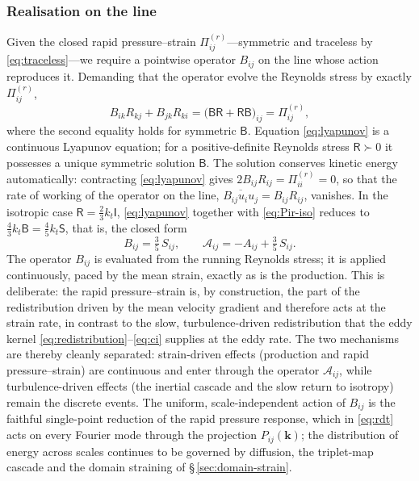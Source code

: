 \documentclass[lineno]{JFM-FLM_Au}
\begin{document}
\subsubsection{Realisation on the line}

Given the closed rapid pressure--strain $\Pi_{ij}^{(r)}$---symmetric and
traceless by \eqref{eq:traceless}---we require a pointwise operator
$B_{ij}$ on the line whose action reproduces it. Demanding that the
operator evolve the Reynolds stress by exactly $\Pi_{ij}^{(r)}$,
\begin{equation}
  B_{ik}R_{kj}+B_{jk}R_{ki}
  = \big(\mathsf{B}\mathsf{R}+\mathsf{R}\mathsf{B}\big)_{ij}
  = \Pi_{ij}^{(r)},
  \label{eq:lyapunov}
\end{equation}
where the second equality holds for symmetric $\mathsf{B}$. Equation
\eqref{eq:lyapunov} is a continuous Lyapunov equation; for a
positive-definite Reynolds stress $\mathsf{R}\succ0$ it possesses a unique
symmetric solution $\mathsf{B}$. The solution conserves kinetic energy
automatically: contracting \eqref{eq:lyapunov} gives
$2B_{ij}R_{ij}=\Pi_{ii}^{(r)}=0$, so that the rate of working of the
operator on the line, $\overline{B_{ij}u_iu_j}=B_{ij}R_{ij}$, vanishes. In
the isotropic case $\mathsf{R}=\tfrac23 k_t\mathsf{I}$, \eqref{eq:lyapunov}
together with \eqref{eq:Pir-iso} reduces to $\tfrac43 k_t\mathsf{B}
=\tfrac45 k_t\mathsf{S}$, that is, the closed form
\begin{equation}
  B_{ij} = \tfrac{3}{5}\,S_{ij},
  \qquad
  \mathcal{A}_{ij} = -A_{ij} + \tfrac{3}{5}\,S_{ij}.
  \label{eq:iso-B}
\end{equation}
The operator $B_{ij}$ is evaluated from the running Reynolds stress; it is
applied continuously, paced by the mean strain, exactly as is the
production. This is deliberate: the rapid pressure--strain is, by
construction, the part of the redistribution driven by the mean velocity
gradient and therefore acts at the strain rate, in contrast to the slow,
turbulence-driven redistribution that the eddy kernel
\eqref{eq:redistribution}--\eqref{eq:ci} supplies at the eddy rate. The two
mechanisms are thereby cleanly separated: strain-driven effects (production
and rapid pressure--strain) are continuous and enter through the operator
$\mathcal{A}_{ij}$, while turbulence-driven effects (the inertial cascade
and the slow return to isotropy) remain the discrete events. The uniform,
scale-independent action of $B_{ij}$ is the faithful single-point reduction
of the rapid pressure response, which in \eqref{eq:rdt} acts on every
Fourier mode through the projection $P_{ij}(\boldsymbol{k})$; the
distribution of energy across scales continues to be governed by diffusion,
the triplet-map cascade and the domain straining of
\S\,\ref{sec:domain-strain}.
\end{document}

